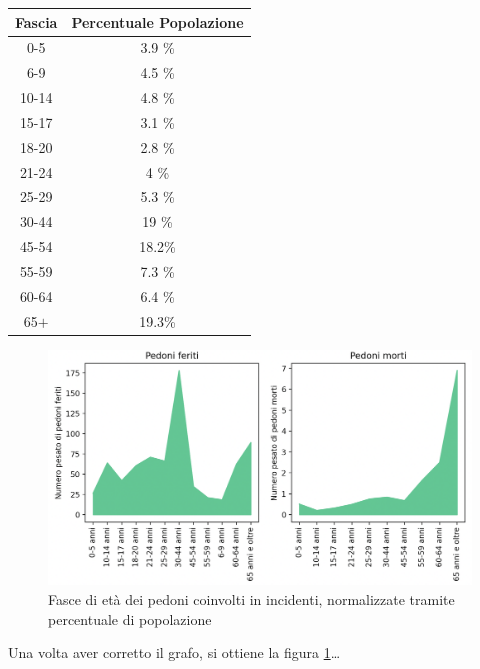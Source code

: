 \documentclass[a4paper]{report}
\begin{document}
\begin{center}
    \def\arraystretch{1.5}%
    \begin{tabular}{ |c|c| } 
    \hline
    Fascia & Percentuale Popolazione \\ 
    \hline
    \rowcolor{TableGray}
    0-5     & 3.9 \% \\ 
    6-9     & 4.5 \% \\
    \rowcolor{TableGray}
    10-14   & 4.8 \% \\
    15-17   & 3.1 \% \\
    \rowcolor{TableGray}
    18-20   & 2.8 \% \\ 
    21-24   & 4   \% \\
    \rowcolor{TableGray}
    25-29   & 5.3 \% \\
    30-44   & 19  \% \\
    \rowcolor{TableGray}
    45-54   & 18.2\% \\ 
    55-59   & 7.3 \% \\
    \rowcolor{TableGray}
    60-64   & 6.4 \% \\
    65$+$   & 19.3\% \\
    \hline
    \end{tabular}
\end{center}


\begin{figure}
    \includegraphics[width=\linewidth]{../src/incidenti/incidenti_senza_coords/pedoni/eta_pedoni_norm.png}
    \caption{Fasce di età dei pedoni coinvolti in incidenti, normalizzate tramite percentuale di popolazione}
    \label{fig:eta-pedoni-norm}
\end{figure}

Una volta aver corretto il grafo, si ottiene la figura \ref{fig:eta-pedoni-norm}\dots
\end{document}
